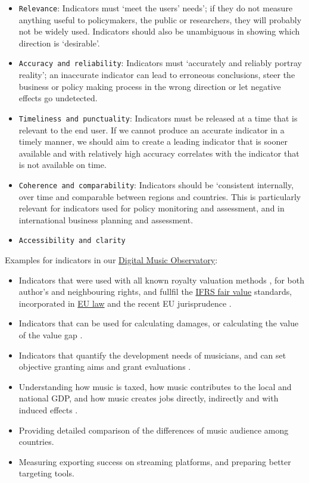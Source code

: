 \documentclass[
  a4paper,
  openany, a4paper, oneside]{book}
\providecommand{\tightlist}{%
  \setlength{\itemsep}{0pt}\setlength{\parskip}{0pt}}
\begin{document}
\begin{itemize}
\tightlist
\item
  \texttt{Relevance}: Indicators must `meet the users' needs'; if they do not measure anything useful to policymakers, the public or researchers, they will probably not be widely used. Indicators should also be unambiguous in showing which direction is `desirable'.
\item
  \texttt{Accuracy\ and\ reliability}: Indicators must `accurately and reliably portray reality'; an inaccurate indicator can lead to erroneous conclusions, steer the business or policy making process in the wrong direction or let negative effects go undetected.
\item
  \texttt{Timeliness\ and\ punctuality}: Indicators must be released at a time that is relevant to the end user. If we cannot produce an accurate indicator in a timely manner, we should aim to create a leading indicator that is sooner available and with relatively high accuracy correlates with the indicator that is not available on time.
\item
  \texttt{Coherence\ and\ comparability}: Indicators should be `consistent internally, over time and comparable between regions and countries. This is particularly relevant for indicators used for policy monitoring and assessment, and in international business planning and assessment.
\item
  \texttt{Accessibility\ and\ clarity}
\end{itemize}

Examples for indicators in our \href{https://music.dataobservatory.eu/}{Digital Music Observatory}:

\begin{itemize}
\item
  Indicators that were used with all known royalty valuation methods \citep{pwc_valuing_2008}, for both author's and neighbouring rights, and fullfil the \href{https://www.ifrs.org/issued-standards/list-of-standards/ifrs-13-fair-value-measurement/}{IFRS fair value} standards, incorporated in \href{https://eur-lex.europa.eu/legal-content/EN/TXT/HTML/?uri=CELEX:32012R1255\&from=EN\%7D}{EU law} and the recent EU jurisprudence \citep{cjeu_osa_2014, cjeu_akka_2017}.
\item
  Indicators that can be used for calculating damages, or calculating the value of the value gap \citep{antal_pcr_croatia_2019, antal_szabad_2019_en}.
\item
  Indicators that quantify the development needs of musicians, and can set objective granting aims and grant evaluations \citep{antal_javaslatok_2015}.
\item
  Understanding how music is taxed, how music contributes to the local and national GDP, and how music creates jobs directly, indirectly and with induced effects \citep{antal_slovenskom_hudobnom_2019}.
\item
  Providing detailed comparison of the differences of music audience among countries.
\item
  Measuring exporting success on streaming platforms, and preparing better targeting tools.
\end{itemize}
\end{document}
